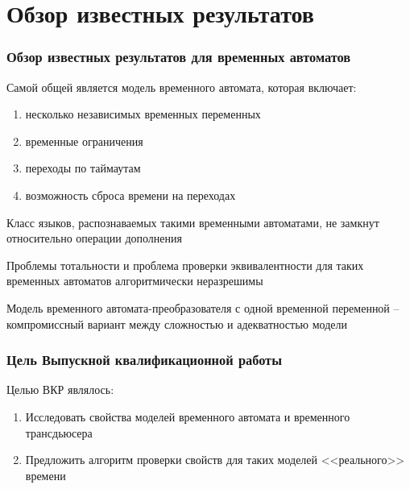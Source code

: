 \documentclass{beamer}
\begin{document}

\section{Обзор известных результатов}

\begin{frame}
\frametitle{Обзор известных результатов для временных автоматов}

Самой общей является модель временного автомата, которая включает:
\begin{enumerate}
    \item несколько независимых временных переменных
    \item временные ограничения
    \item переходы по таймаутам
    \item возможность сброса времени на переходах
\end{enumerate}
 
Класс языков, распознаваемых такими временными автоматами, не замкнут относительно операции дополнения

Проблемы тотальности и проблема проверки эквивалентности для таких временных автоматов алгоритмически неразрешимы

Модель временного автомата-преобразователя с одной временной переменной -- компромиссный вариант между сложностью и адекватностью модели

\end{frame}

\begin{frame}
\frametitle{Цель Выпускной квалификационной работы}

Целью ВКР являлось:
\begin{enumerate}
    \item Исследовать свойства моделей временного автомата и временного трансдьюсера
    
    \item Предложить алгоритм проверки свойств для таких моделей <<реального>> времени
\end{enumerate}

	
	

\end{frame}
\end{document}
